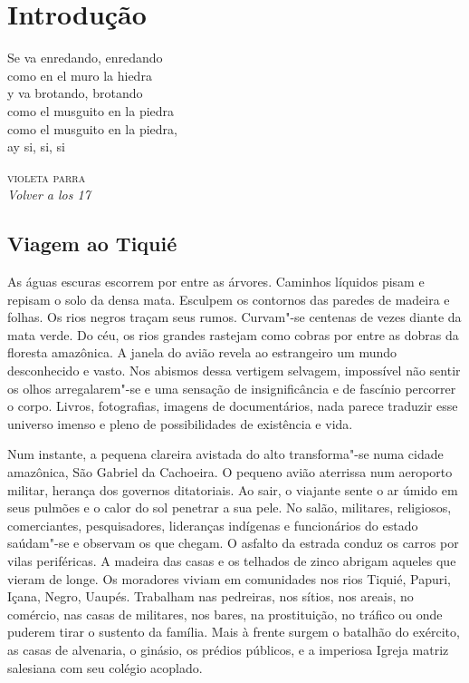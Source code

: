 \chapter{Introdução}

\epigraph{
Se va enredando, enredando\\
como en el muro la hiedra\\
y va brotando, brotando\\ 
como el musguito en la piedra\\
como el musguito en la piedra,\\
ay si, si, si
}{\textsc{violeta parra}\\
\textit{Volver a los 17}}

\section{Viagem ao Tiquié}\label{viagem-ao-tiquiuxe9}

As águas escuras escorrem por entre as árvores. Caminhos líquidos pisam
e repisam o solo da densa mata. Esculpem os contornos das paredes de
madeira e folhas. Os rios negros traçam seus rumos. Curvam"-se centenas
de vezes diante da mata verde. Do céu, os rios grandes rastejam como
cobras por entre as dobras da floresta amazônica. A janela do avião
revela ao estrangeiro um mundo desconhecido e vasto. Nos abismos dessa
vertigem selvagem, impossível não sentir os olhos arregalarem"-se e uma
sensação de insignificância e de fascínio percorrer o corpo. Livros,
fotografias, imagens de documentários, nada parece traduzir esse
universo imenso e pleno de possibilidades de existência e vida.

Num instante, a pequena clareira avistada do alto transforma"-se numa
cidade amazônica, São Gabriel da Cachoeira. O pequeno avião aterrissa
num aeroporto militar, herança dos governos ditatoriais. Ao sair, o
viajante sente o ar úmido em seus pulmões e o calor do sol penetrar a
sua pele. No salão, militares, religiosos, comerciantes, pesquisadores,
lideranças indígenas e funcionários do estado saúdam"-se e observam os
que chegam. O asfalto da estrada conduz os carros por vilas periféricas.
A madeira das casas e os telhados de zinco abrigam aqueles que vieram de
longe. Os moradores viviam em comunidades nos rios Tiquié, Papuri,
Içana, Negro, Uaupés. Trabalham nas pedreiras, nos sítios, nos areais,
no comércio, nas casas de militares, nos bares, na prostituição, no
tráfico ou onde puderem tirar o sustento da família. Mais à frente
surgem o batalhão do exército, as casas de alvenaria, o ginásio, os
prédios públicos, e a imperiosa Igreja matriz salesiana com seu colégio
acoplado.

